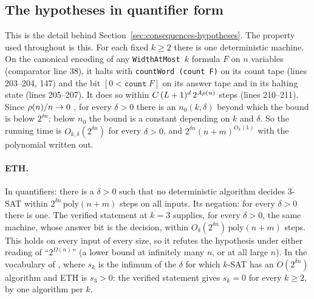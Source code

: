 \subsection{The hypotheses in quantifier form}
\label{app:tech-hypotheses}

This is the detail behind Section~\ref{sec:consequences-hypotheses}.
The property used throughout is this. For each fixed $k \ge 2$ there is one
deterministic machine. On the canonical encoding of any
\texttt{WidthAtMost}~$k$ formula $F$ on $n$ variables (comparator line
38), it halts with \texttt{countWord (count F)} on its count tape (lines
203--204, 147) and the bit $[0 < \mathtt{count}\ F]$ on its answer tape and
in its halting state (lines 205--207). It does so within $C\,(L+1)^d\,2^{A\rho(n)}$
steps (lines 210--211). Since $\rho(n)/n \to 0$ ,
for every $\delta > 0$ there is an $n_0(k, \delta)$ beyond which the
bound is below $2^{\delta n}$; below $n_0$ the bound is a constant
depending on $k$ and $\delta$. So the running time is
$O_{k,\delta}(2^{\delta n})$ for every $\delta > 0$, and
$2^{\delta n}(n+m)^{O_k(1)}$ with the polynomial written out.

\paragraph{ETH.} In quantifiers: there is a $\delta > 0$ such that no
deterministic algorithm decides 3-SAT within $2^{\delta n}\,\mathrm{poly}(n+m)$
steps on all inputs. Its negation: for every $\delta > 0$ there is one.
The verified statement at $k = 3$ supplies, for every $\delta > 0$, the
same machine, whose answer bit is the decision, within
$O_{\delta}(2^{\delta n})\,\mathrm{poly}(n+m)$ steps. This holds on every
input of every size, so it refutes the hypothesis under either reading
of ``$2^{\Omega(n)}$'' (a lower bound at infinitely many $n$, or at all
large $n$). In the vocabulary of \citet{ImpagliazzoPaturi2001}, where
$s_k$ is the infimum of the $\delta$ for which $k$-SAT has an
$O(2^{\delta n})$ algorithm and ETH is $s_3 > 0$: the verified statement
gives $s_k = 0$ for every $k \ge 2$, by one algorithm per $k$.

